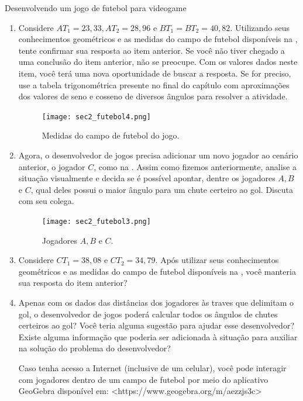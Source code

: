 \begin{task}{Desenvolvendo um jogo de futebol para videogame}
\begin{enumerate}
    \item{}
    Considere $AT_1=23,33, AT_2=28,96$ e $BT_1=BT_2=40,82$. Utilizando seus conhecimentos geométricos e as medidas do campo de futebol disponíveis na , tente confirmar sua resposta ao item anterior. Se você não tiver chegado a uma conclusão do item anterior, não se preocupe. Com os valores dados neste item, você terá uma nova oportunidade de buscar a resposta. Se for preciso, use a tabela trigonométrica presente no final do capítulo com aproximações dos valores de seno e cosseno de diversos ângulos para resolver a atividade.
\begin{figure}[H]
    \centering
    \texttt{[image: sec2\_futebol4.png]}
    \caption{Medidas do campo de futebol do jogo.}
    \label{sec2_futebol4_fig}
\end{figure}

    
    \item{}
    Agora, o desenvolvedor de jogos precisa adicionar um novo jogador ao cenário anterior, o jogador $C$, como na . Assim como fizemos anteriormente, analise a situação visualmente e decida se é possível apontar, dentre os jogadores $A, B$ e $C$, qual deles possui o maior ângulo para um chute certeiro ao gol. Discuta com seu colega.
\begin{figure}[H]
    \centering
    \texttt{[image: sec2\_futebol3.png]}
    \caption{Jogadores $A, B$ e $C$.}
    \label{sec2_futebol3_fig}
\end{figure}



    \item{}
    Considere $CT_1=38,08$ e $CT_2=34,79$. Após utilizar seus conhecimentos geométricos e as medidas do campo de futebol disponíveis na , você manteria sua resposta do item anterior?

    \item{}
    Apenas com os dados das distâncias dos jogadores às traves que delimitam o gol, o desenvolvedor de jogos poderá calcular todos os ângulos de chutes certeiros ao gol? Você teria alguma sugestão para ajudar esse desenvolvedor? Existe alguma informação que poderia ser adicionada à situação para auxiliar na solução do problema do desenvolvedor?
    
    Caso tenha acesso a Internet (inclusive de um celular), você pode interagir com jogadores dentro de um campo de futebol por meio do aplicativo GeoGebra disponível em: <https://www.geogebra.org/m/aezzjs3c>
    

\end{enumerate}
\end{task}

